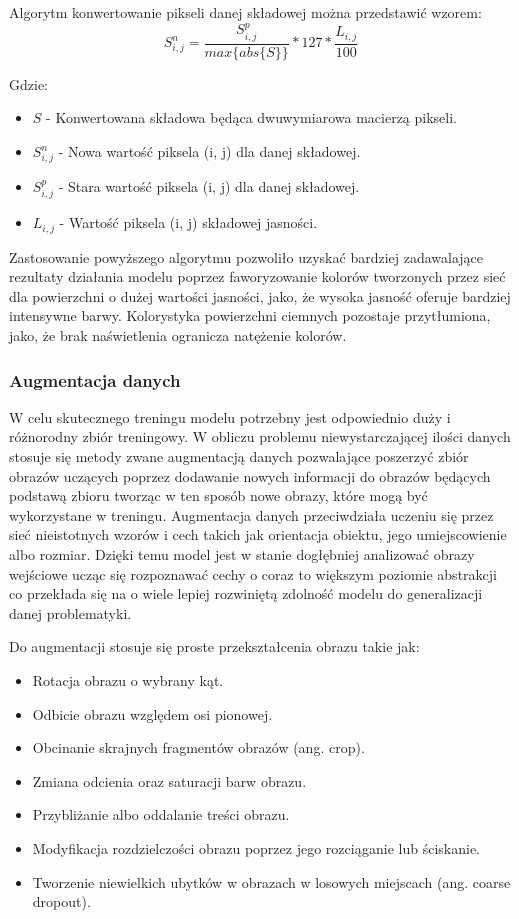   \noindent
  Algorytm konwertowanie pikseli danej składowej można przedstawić wzorem:
  \begin{equation}
  S_{i, j}^{n} = \frac{S_{i, j}^{p}}{max\{abs\{S\}\}} * 127 * \frac{L_{i, j}}{100}
  \end{equation}

  \noindent
  Gdzie:
  \begin{itemize}
    \item $S$ - Konwertowana składowa będąca dwuwymiarowa macierzą pikseli.
    \item $S_{i, j}^{n}$ - Nowa wartość piksela (i, j) dla danej składowej.
    \item $S_{i, j}^{p}$ - Stara wartość piksela (i, j) dla danej składowej.
    \item $L_{i, j}$ - Wartość piksela (i, j) składowej jasności.
  \end{itemize}

  Zastosowanie powyższego algorytmu pozwoliło uzyskać bardziej zadawalające
  rezultaty działania modelu poprzez faworyzowanie kolorów tworzonych przez sieć
  dla powierzchni o dużej wartości jasności, jako, że wysoka jasność oferuje
  bardziej intensywne barwy. Kolorystyka powierzchni ciemnych pozostaje
  przytłumiona, jako, że brak naświetlenia ogranicza natężenie kolorów.

\subsubsection{Augmentacja danych}

  W celu skutecznego treningu modelu potrzebny jest odpowiednio duży i różnorodny
  zbiór treningowy. W obliczu problemu niewystarczającej ilości danych stosuje
  się metody zwane augmentacją danych pozwalające poszerzyć zbiór obrazów uczących
  poprzez dodawanie nowych informacji do obrazów będących podstawą zbioru tworząc
  w ten sposób nowe obrazy, które mogą być wykorzystane w treningu. Augmentacja
  danych przeciwdziała uczeniu się przez sieć nieistotnych wzorów i cech takich jak
  orientacja obiektu, jego umiejscowienie albo rozmiar. Dzięki temu model jest
  w stanie dogłębniej analizować obrazy wejściowe ucząc się rozpoznawać cechy
  o coraz to większym poziomie abstrakcji co przekłada się na o wiele lepiej
  rozwiniętą zdolność modelu do generalizacji danej problematyki.

  \noindent
  Do augmentacji stosuje się proste przekształcenia obrazu takie jak:
  \begin{itemize}
  \item Rotacja obrazu o wybrany kąt.
  \item Odbicie obrazu względem osi pionowej.
  \item Obcinanie skrajnych fragmentów obrazów (ang. crop).
  \item Zmiana odcienia oraz saturacji barw obrazu.
  \item Przybliżanie albo oddalanie treści obrazu.
  \item Modyfikacja rozdzielczości obrazu poprzez jego rozciąganie lub ściskanie.
  \item Tworzenie niewielkich ubytków w obrazach w losowych miejscach (ang. coarse dropout).
  \end{itemize}

